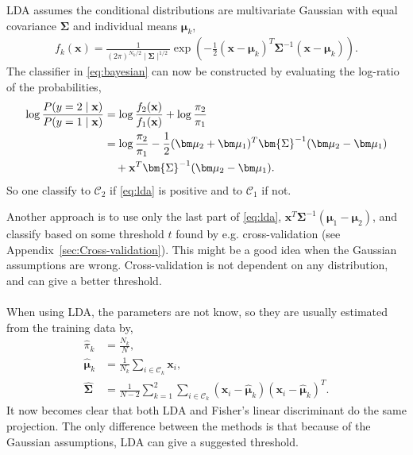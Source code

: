 LDA assumes the conditional distributions are multivariate Gaussian with equal covariance $\bm{\Sigma}$ and individual means $\bm\mu_k$,
\begin{align}
  f_k(\mathbf{x}) =  \frac{1}{(2\pi)^{N_k/2}\mid \bm{\Sigma}\mid ^{1/2}} \exp\left( -\frac{1}{2} (\mathbf{x}-\bm \mu_k)^T \bm{\Sigma}^{-1} (\mathbf{x}-\bm \mu_k)\right).
\end{align}
The classifier in \eqref{eq:bayesian} can now be constructed by evaluating the log-ratio of the probabilities,
\begin{align}
  \label{eq:lda} 
  \log{\frac{P(y=2\mid \mathbf{x})}{P(y=1\mid \mathbf{x})}} &= \log{\frac{f_2(\mathbf{x})}{f_1(\mathbf{x})} } + \log{\frac{\pi_2}{\pi_1} } \notag \ \\
  &= \log{\frac{\pi_2}{\pi_1}} -\frac{1}{2} (\bm \mu_2+\bm \mu_1)^T \bm{\Sigma}^{-1} (\bm \mu_2-\bm \mu_1) \\
  & \quad + \mathbf{x}^T\bm{\Sigma}^{-1} (\bm \mu_2-\bm \mu_1).
  \notag \ 
\end{align}
So one classify to $\mathcal{C}_2$ if \eqref{eq:lda} is positive and to $\mathcal{C}_1$ if not. 

Another approach is to use only the last part of \eqref{eq:lda}, $\mathbf{x}^T\bm{\Sigma}^{-1} (\bm \mu_1-\bm \mu_2)$, and classify based on some threshold $t$ found by e.g. cross-validation (see Appendix~\ref{sec:Cross-validation}). This might be a good idea when the Gaussian assumptions are wrong. Cross-validation is not dependent on any distribution, and can give a better threshold. 
\\
\\
When using LDA, the parameters are not know, so they are usually estimated from the training data by,
\begin{align}
   \hat{\pi}_k &= \frac{N_k}{N},  \\
   \hat{\bm \mu}_k &= \frac{1}{N_k} \sum_{i \in \mathcal{C}_k}\mathbf{x}_i, \\
   \hat{\bm \Sigma} &= \frac{1}{N-2} \sum_{k = 1}^{2} \sum_{i \in \mathcal{C}_k}(\mathbf{x}_i - \hat{\bm{\mu}}_k)(\mathbf{x}_i - \hat{\bm{\mu}}_k)^T.
\end{align}
It now becomes clear that both LDA and Fisher's linear discriminant do the same projection. The only difference between the methods is that because of the Gaussian assumptions, LDA can give a suggested threshold.
%
